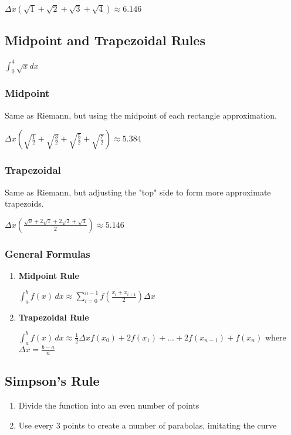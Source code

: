 \documentclass{article}
\begin{document}
$\Delta x(\sqrt{1} + \sqrt{2} + \sqrt{3} + \sqrt{4}) \mathbf{\approx 6.146}$

\subsection{Midpoint and Trapezoidal Rules}

$\int_{0}^{4} \sqrt{x} dx$ 

\subsubsection{Midpoint}

Same as Riemann, but using the midpoint of each rectangle approximation.

$\Delta x (\sqrt{\frac{1}{2}}+  \sqrt{\frac{3}{2}}+ \sqrt{\frac{5}{2}}+ \sqrt{\frac{7}{2}}) \mathbf{\approx 5.384}$

\subsubsection{Trapezoidal}

Same as Riemann, but adjusting the "top" side to form more approximate trapezoids.

$\Delta x (\frac{\sqrt{0} + 2\sqrt{1} + 2\sqrt{3} + \sqrt{4}}{2}) \mathbf{\approx 5.146}$

\subsubsection{General Formulas}
\begin{enumerate}
    \item \textbf{Midpoint Rule}
    
    $\int_{a}^{b} f(x) \,dx \approx \sum_{i=0}^{n-1} f(\frac{x_i+x_{i+1}}{2}) \Delta x $
    
    \item \textbf{Trapezoidal Rule}
    
    $\int_{a}^{b} f(x) \,dx \approx \frac{1}{2}\Delta x f(x_0) + 2f(x_1) + ... + 2f(x_{n-1}) + f(x_n)$ where $\Delta x = \frac{b-a}{n}$
\end{enumerate}

\subsection{Simpson's Rule}

\begin{enumerate}
    \item Divide the function into an even number of points
    \item Use every 3 points to create a number of parabolas, imitating the curve
\end{enumerate}
\end{document}
